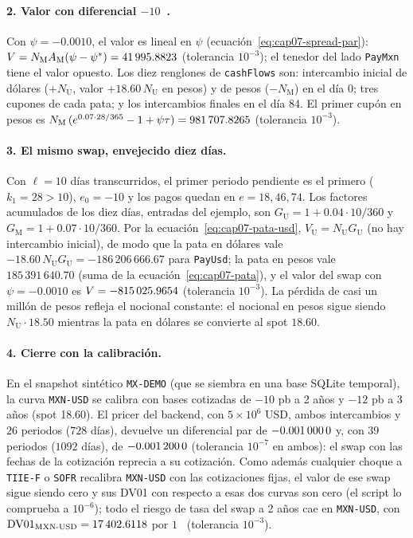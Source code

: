 \paragraph{2. Valor con diferencial $-10$~\pb.} Con $\psi=-0.0010$, el valor es lineal en $\psi$
(ecuación~\eqref{eq:cap07-spread-par}): $\PV=N_{\mathrm M}\Ann_{\mathrm M}(\psi-\psi^{*})
=\verif{cap07-pv-spread}{41995.8823}$ \MXN{} (tolerancia $10^{-3}$); el tenedor del lado \texttt{PayMxn}
tiene el valor opuesto. Los diez renglones de \texttt{cashFlows} son: intercambio inicial de dólares
($+N_{\mathrm U}$, valor $+18.60\,N_{\mathrm U}$ en pesos) y de pesos ($-N_{\mathrm M}$) en el día $0$; tres cupones
de cada pata; y los intercambios finales en el día $84$. El primer cupón en pesos es
$N_{\mathrm M}\,(e^{0.07\cdot28/365}-1+\psi\tau)=\verif{cap07-cupon-mxn}{981707.8265}$ \MXN{}
(tolerancia $10^{-3}$).

\paragraph{3. El mismo swap, envejecido diez días.} Con $\ell=10$ días transcurridos, el primer
periodo pendiente es el primero ($k_1=28>10$), $e_0=-10$ y los pagos quedan en $e=18,46,74$. Los factores acumulados de los diez días, entradas
del ejemplo, son $G_{\mathrm U}=1+0.04\cdot10/360$ y $G_{\mathrm M}=1+0.07\cdot10/360$. Por la
ecuación~\eqref{eq:cap07-pata-usd}, $V_{\mathrm U}=N_{\mathrm U}G_{\mathrm U}$ (no hay intercambio inicial), de
modo que la pata en dólares vale $-18.60\,N_{\mathrm U}G_{\mathrm U}=-186\,206\,666.67$ \MXN{} para \texttt{PayUsd}; la
pata en pesos vale $185\,391\,640.70$ \MXN{} (suma de la ecuación~\eqref{eq:cap07-pata}), y el valor del swap con
$\psi=-0.0010$ es $\PV=\verif{cap07-pv-envejecido}{-815025.9654}$ \MXN{} (tolerancia $10^{-3}$). La pérdida
de casi un millón de pesos refleja el nocional constante: el nocional en pesos sigue siendo
$N_{\mathrm U}\cdot18.50$ mientras la pata en dólares se convierte al spot $18.60$.

\paragraph{4. Cierre con la calibración.} En el snapshot sintético \texttt{MX-DEMO} (que se siembra en una base
SQLite temporal), la curva \texttt{MXN-USD} se calibra con bases cotizadas de $-10$ pb a 2 años y $-12$ pb a 3
años (spot 18.60). El pricer del backend, con $5\times10^{6}$ USD, ambos intercambios y $26$ periodos
($728$ días), devuelve un diferencial par de $\verif{cap07-spread-par-2a}{-0.0010000}$ y, con $39$ periodos
($1092$ días), de $\verif{cap07-spread-par-3a}{-0.0012000}$ (tolerancia $10^{-7}$ en ambos): el swap con las
fechas de la cotización reprecia a su cotización. Como además cualquier choque a \texttt{TIIE-F} o \texttt{SOFR}
recalibra \texttt{MXN-USD} con las cotizaciones fijas, el valor de ese swap sigue siendo cero y sus DV01 con
respecto a esas dos curvas son cero (el script lo comprueba a $10^{-6}$); todo el riesgo de tasa del swap a
2 años cae en \texttt{MXN-USD}, con
$\mathrm{DV01}_{\cMXNcol}=\verif{cap07-dv01-mxn-usd}{17402.6118}$ \MXN{} por $1$~\pb{} (tolerancia $10^{-3}$).

